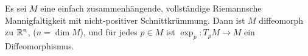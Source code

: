 Es sei $M$ \pause eine einfach zusammenhängende, \pause vollständige \pause Riemannsche Mannigfaltigkeit \pause mit nicht-positiver Schnittkrümmung. \pause Dann ist $M$ diffeomorph zu $\mathbb{R}^n$, \pause ($n=\dim M$), \pause und für jedes $p\in M$ ist $\exp_p\colon T_pM\to M$ ein Diffeomorphismus.
